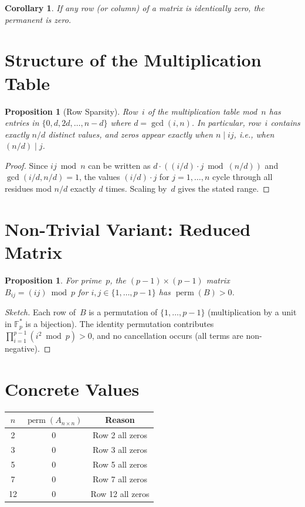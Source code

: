 \documentclass[11pt]{article}
\newtheorem{corollary}[theorem]{Corollary}
\newtheorem{proposition}[theorem]{Proposition}
\begin{document}
\begin{corollary}
If \emph{any} row (or column) of a matrix is identically zero, the permanent is zero.
\end{corollary}

\section{Structure of the Multiplication Table}

\begin{proposition}[Row Sparsity]
Row~$i$ of the multiplication table mod~$n$ has entries in $\{0, d, 2d, \ldots, n-d\}$ where $d = \gcd(i,n)$. In particular, row~$i$ contains exactly $n/d$ distinct values, and zeros appear exactly when $n \mid ij$, i.e., when $(n/d) \mid j$.
\end{proposition}

\begin{proof}
Since $ij \bmod n$ can be written as $d \cdot ((i/d) \cdot j \bmod (n/d))$ and $\gcd(i/d, n/d) = 1$, the values $(i/d) \cdot j$ for $j = 1, \ldots, n$ cycle through all residues mod $n/d$ exactly $d$ times. Scaling by~$d$ gives the stated range.
\end{proof}

\section{Non-Trivial Variant: Reduced Matrix}

\begin{proposition}
For prime~$p$, the $(p-1) \times (p-1)$ matrix $B_{ij} = (ij) \bmod p$ for $i,j \in \{1,\ldots,p-1\}$ has $\operatorname{perm}(B) > 0$.
\end{proposition}

\begin{proof}[Sketch]
Each row of~$B$ is a permutation of $\{1,\ldots,p-1\}$ (multiplication by a unit in $\mathbb{F}_p^*$ is a bijection). The identity permutation contributes $\prod_{i=1}^{p-1} (i^2 \bmod p) > 0$, and no cancellation occurs (all terms are non-negative).
\end{proof}

\section{Concrete Values}

\begin{center}
\begin{tabular}{ccc}
\toprule
$n$ & $\operatorname{perm}(A_{n \times n})$ & Reason \\
\midrule
2  & 0 & Row 2 all zeros \\
3  & 0 & Row 3 all zeros \\
5  & 0 & Row 5 all zeros \\
7  & 0 & Row 7 all zeros \\
12 & 0 & Row 12 all zeros \\
\bottomrule
\end{tabular}
\end{center}
\end{document}
